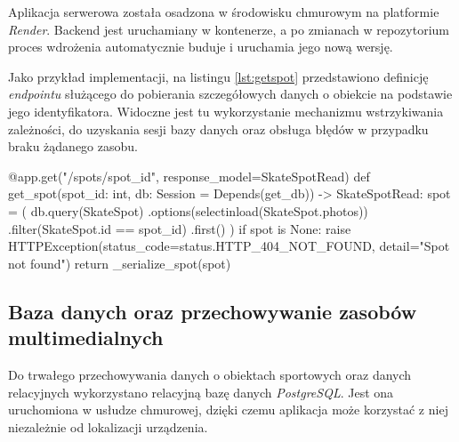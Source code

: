         Aplikacja serwerowa została osadzona w środowisku chmurowym na platformie \textit{Render}. Backend jest uruchamiany w kontenerze, a po zmianach w repozytorium proces wdrożenia automatycznie buduje i uruchamia jego nową wersję. 

        Jako przykład implementacji, na listingu \ref{lst:getspot} przedstawiono definicję \textit{endpointu} służącego do pobierania szczegółowych danych o obiekcie na podstawie jego identyfikatora. Widoczne jest tu wykorzystanie mechanizmu wstrzykiwania zależności, do uzyskania sesji bazy danych oraz obsługa błędów w przypadku braku żądanego zasobu.

        \begin{code}[
                language=Python,
                caption={\textit{Endpoint} \texttt{get\_spot}.},
                label={lst:getspot}
            ]
@app.get("/spots/{spot_id}", response_model=SkateSpotRead)
def get_spot(spot_id: int, db: Session = Depends(get_db)) -> SkateSpotRead:
    spot = (
        db.query(SkateSpot)
        .options(selectinload(SkateSpot.photos))
        .filter(SkateSpot.id == spot_id)
        .first()
    )
    if spot is None:
        raise HTTPException(status_code=status.HTTP_404_NOT_FOUND,
        detail="Spot not found")
    return _serialize_spot(spot)\end{code} 
        
    \subsection{Baza danych oraz przechowywanie zasobów multimedialnych}

        Do trwałego przechowywania danych o obiektach sportowych oraz danych relacyjnych wykorzystano relacyjną bazę danych \textit{PostgreSQL}. Jest ona uruchomiona w usłudze chmurowej, dzięki czemu aplikacja może korzystać z niej niezależnie od lokalizacji urządzenia. 

